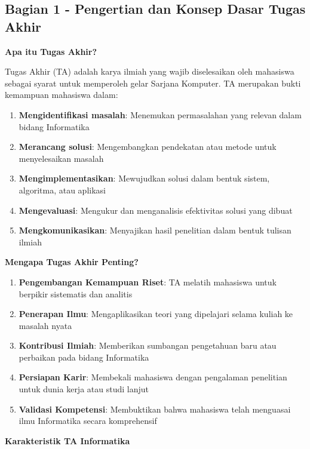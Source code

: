 \subsection*{Bagian 1 - Pengertian dan Konsep Dasar Tugas Akhir}

\textbf{Apa itu Tugas Akhir?}

Tugas Akhir (TA) adalah karya ilmiah yang wajib diselesaikan oleh mahasiswa sebagai syarat untuk memperoleh gelar Sarjana Komputer. TA merupakan bukti kemampuan mahasiswa dalam:

\begin{enumerate}
    \item \textbf{Mengidentifikasi masalah}: Menemukan permasalahan yang relevan dalam bidang Informatika
    \item \textbf{Merancang solusi}: Mengembangkan pendekatan atau metode untuk menyelesaikan masalah
    \item \textbf{Mengimplementasikan}: Mewujudkan solusi dalam bentuk sistem, algoritma, atau aplikasi
    \item \textbf{Mengevaluasi}: Mengukur dan menganalisis efektivitas solusi yang dibuat
    \item \textbf{Mengkomunikasikan}: Menyajikan hasil penelitian dalam bentuk tulisan ilmiah
\end{enumerate}

\textbf{Mengapa Tugas Akhir Penting?}

\begin{enumerate}
    \item \textbf{Pengembangan Kemampuan Riset}: TA melatih mahasiswa untuk berpikir sistematis dan analitis
    \item \textbf{Penerapan Ilmu}: Mengaplikasikan teori yang dipelajari selama kuliah ke masalah nyata
    \item \textbf{Kontribusi Ilmiah}: Memberikan sumbangan pengetahuan baru atau perbaikan pada bidang Informatika
    \item \textbf{Persiapan Karir}: Membekali mahasiswa dengan pengalaman penelitian untuk dunia kerja atau studi lanjut
    \item \textbf{Validasi Kompetensi}: Membuktikan bahwa mahasiswa telah menguasai ilmu Informatika secara komprehensif
\end{enumerate}

\textbf{Karakteristik TA Informatika}


